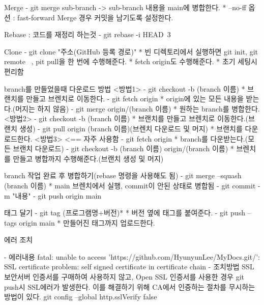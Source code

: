Merge
  - git merge sub-branch
    -> sub-branch 내용을 main에 병합한다.
    * --no-ff 옵션 : fast-forward Merge 경우 커밋을 남기도록 설정한다.

Rebase : 코드를 재정리 하는것
  - git rebase -i HEAD~3

Clone
  - git clone "주소(GitHub 등록 경로)"
    * 빈 디렉토리에서 실행하면 git init, git remote ~, pit pull을 한 번에 수행해준다.
    * fetch origin도 수행해준다.
    * 초기 세팅시 편리함

branch를 만들었을때 다운로드 방법
  <방법1>
  - git checkout -b (branch 이름)
    * 브랜치를 만들고 브렌치로 이동한다.
  - git fetch origin
    * origin에 있는 모든 내용을 받는다.(머지는 하지 않음)
  - git merge origin/(branch 이름)
    * 원하는 branch를 병합한다.
  <방법2>
  - git checkout -b (branch 이름)
    * 브랜치를 만들고 브렌치로 이동한다.(브랜치 생성)
  - git pull origin (branch 이름)(브렌치 다운로드 및 머지)
    * 브랜치를 다운로드한다.
  <방법3> <== 자주 사용함
  - git fetch origin
    * branch를 다운받는다.(모든 브랜치 다운로드)
  - git checkout -b (branch 이름) origin/(branch 이름)
    * 브렌치를 만들고 병합까지 수행해준다.(브랜치 생성 및 머지)

branch 작업 완료 후 병합하기(rebase 명령을 사용해도 됨)
  - git merge --squash (branch 이름)
    * main 브렌치에서 실행, commit이 안된 상태로 병합됨
  - git commit -m "내용"
  - git push origin main

태그 달기
  - git tag (프로그램명+버전)*
    * 버전 옆에 태그를 붙여준다.
  - git push --tags origin main 
    * 만들어진 태그까지 업로드한다.

에러 조치

- 에러내용 
   fatal: unable to access 'https://github.com/HyunyunLee/MyDocs.git/': SSL certificate problem: self signed certificate in certificate chain
- 조치방법
   SSL 보안서버 인증서를 구매하여 사용하지 않고, Open SSL 인증서를 사용한 경우 git push시 SSL에러가 발생한다.
   이를 해결하기 위해 CA에서 인증하는 절차를 무시하는 방법이 있다.
   git config --global http.sslVerify false
